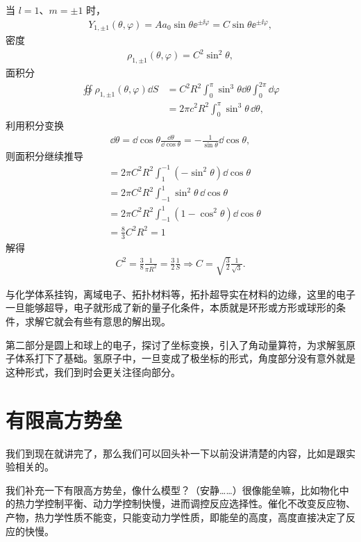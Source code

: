 当 $l=1$、$m=\pm1$ 时，
\begin{align}
    Y_{1,\pm1}(\theta, \varphi) = A a_0 \sin\theta \ee^{\pm\ii\varphi} = C \sin\theta \ee^{\pm\ii\varphi},
\end{align}
密度
\begin{align}
    \rho_{1,\pm1} (\theta, \varphi) = C^2 \sin^2\theta, 
\end{align}
面积分
\begin{align}
    \oiint \rho_{1,\pm1} (\theta, \varphi) \dd S 
    &= C^2 R^2 \int_0^\pi \sin^3\theta \dd\theta \int_0^{2\pi} \dd\varphi \\
    &= 2\pi c^2 R^2 \int_0^\pi \sin^3\theta \,\dd\theta,
\end{align}
利用积分变换
\begin{align}
    \dd\theta = \dd\cos\theta \frac{\dd\theta}{\dd\cos\theta} = -\frac{1}{\sin\theta} \dd\cos\theta,
\end{align}
则面积分继续推导
\begin{align}
    &= 2\pi C^2R^2 \int_1^{-1} (-\sin^2\theta)\dd\cos\theta \\
    &= 2\pi C^2R^2 \int_{-1}^{1} \sin^2\theta\,\dd\cos\theta \\
    &= 2\pi C^2 R^2 \int_{-1}^1 (1-\cos^2\theta) \dd\cos\theta\\
    &= \frac83 C^2R^2 = 1
\end{align}
解得
\begin{align}
    C^2 = \frac 38 \frac1{\pi R^2} = \frac 32 \frac1S \Rightarrow C = \sqrt{\frac32}\frac1{\sqrt 3}. 
\end{align}

与化学体系挂钩，离域电子、拓扑材料等，拓扑超导实在材料的边缘，这里的电子一旦能够超导，电子就形成了新的量子化条件，本质就是环形或方形或球形的条件，求解它就会有些有意思的解出现。

第二部分是圆上和球上的电子，探讨了坐标变换，引入了角动量算符，为求解氢原子体系打下了基础。氢原子中，一旦变成了极坐标的形式，角度部分没有意外就是这种形式，我们到时会更关注径向部分。

\section{有限高方势垒}

我们到现在就讲完了，那么我们可以回头补一下以前没讲清楚的内容，比如是跟实验相关的。

我们补充一下有限高方势垒，像什么模型？（安静……）很像能垒嘛，比如物化中的热力学控制平衡、动力学控制快慢，进而调控反应选择性。催化不改变反应物、产物，热力学性质不能变，只能变动力学性质，即能垒的高度，高度直接决定了反应的快慢。

